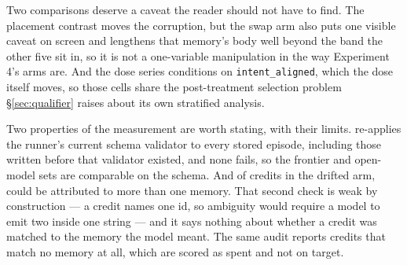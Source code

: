 Two comparisons deserve a caveat the reader should not have to find. The
placement contrast moves the corruption, but the swap arm also puts one visible
caveat on screen and lengthens that memory's body well beyond the band the other
five sit in, so it is not a one-variable manipulation in the way Experiment 4's
arms are. And the dose series conditions on \texttt{intent\_aligned}, which the
dose itself moves, so those cells share the post-treatment selection problem
\S\ref{sec:qualifier} raises about its own stratified analysis.

Two properties of the measurement are worth stating, with their limits.
 re-applies the runner's current
schema validator to every stored episode, including those written before that
validator existed, and none fails, so the frontier and open-model sets are
comparable on the schema. And of \SixCredits{} credits in the drifted arm,
\SixAmbiguous{} could be attributed to more than one memory. That second check
is weak by construction --- a credit names one id, so ambiguity would require a
model to emit two inside one string --- and it says nothing about whether a
credit was matched to the memory the model meant. The same audit reports
\SixUnresolvable{} credits that match no memory at all, which are scored as
spent and not on target.
